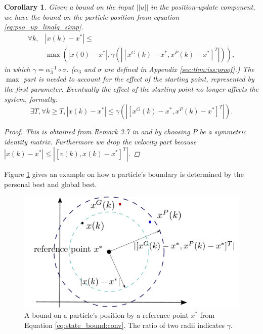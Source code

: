 \documentclass{sig-alternate}
\newtheorem{mycoro}{Corollary}
\begin{document}
\begin{mycoro}
\label{coro:state_bound}
Given a bound on the input $ || u || $ in the position-update component, we have the bound on the particle position from equation \eqref{eq:pso_up_linalg_simp}.
\begin{equation}
\label{eq:state_bound}
\begin{aligned}
\forall k, 
& | x(k) - x^{*} | \leq \\
& \max \left( | x(0) - x^{*} | , \gamma ( | [ x^{G}(k) - x^{*}, x^{P}(k) - x^{*} ]^{T} | ) \right),
\end{aligned}
\end{equation}
in which $ \gamma = \alpha_{3}^{-1} \circ \sigma $.
($ \alpha_{3} $ and $ \sigma $ are defined in Appendix \ref{sec:thm:iss:proof}.)
The $ \max $ part is needed to account for the effect of the starting point, represented by the first parameter. Eventually the effect of the starting point no longer affects the system, formally:
\begin{equation}
\label{eq:state_bound:conv}
\exists T, \forall k \geq T, 
|  x(k) - x^{*} | \leq \gamma ( | [ x^{G}(k) - x^{*}, x^{P}(k) - x^{*} ]^{T} | ).
\end{equation}
\begin{proof}
This is obtained from Remark 3.7 in \cite{Jiang2001857} and by choosing $ P $ be a symmetric identity matrix.
Furthermore we drop the velocity part because $ | x(k) - x^{*} | \leq | [ v(k), x(k) - x^{*} ]^{T} | $.
\end{proof}
\end{mycoro}

Figure \ref{fig:boundary} gives an example on how a particle's boundary is determined by the personal best and global best.

\begin{figure}
\centering
\includegraphics[width=0.8\linewidth]{./boundary}
\caption{A bound on a particle's position by a reference point $ x^{*} $ from Equation \ref{eq:state_bound:conv}.
The ratio of two radii indicates $ \gamma $.}
\label{fig:boundary}
\end{figure}
\end{document}
